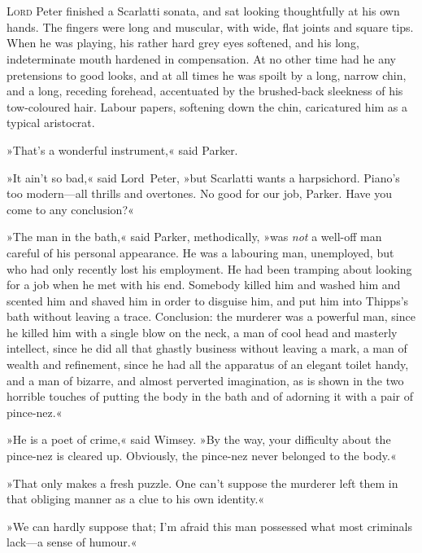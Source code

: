 \chapter[Chapter \thechapter]{}
\lettrine[lines=4]{L}{ord} Peter finished a Scarlatti sonata, and sat looking thoughtfully at his own hands. The fingers were long and muscular, with wide, flat joints and square tips. When he was playing, his rather hard grey eyes softened, and his long, indeterminate mouth hardened in compensation. At no other time had he any pretensions to good looks, and at all times he was spoilt by a long, narrow chin, and a long, receding forehead, accentuated by the brushed-back sleekness of his tow-coloured hair. Labour papers, softening down the chin, caricatured him as a typical aristocrat.

»That's a wonderful instrument,« said Parker.

»It ain't so bad,« said Lord~Peter, »but Scarlatti wants a harpsichord. Piano's too modern—all thrills and overtones. No good for our job, Parker. Have you come to any conclusion?«

»The man in the bath,« said Parker, methodically, »was \textit{not} a well-off man careful of his personal appearance. He was a labouring man, unemployed, but who had only recently lost his employment. He had been tramping about looking for a job when he met with his end. Somebody killed him and washed him and scented him and shaved him in order to disguise him, and put him into Thipps's bath without leaving a trace. Conclusion: the murderer was a powerful man, since he killed him with a single blow on the neck, a man of cool head and masterly intellect, since he did all that ghastly business without leaving a mark, a man of wealth and refinement, since he had all the apparatus of an elegant toilet handy, and a man of bizarre, and almost perverted imagination, as is shown in the two horrible touches of putting the body in the bath and of adorning it with a pair of pince-nez.«

»He is a poet of crime,« said Wimsey. »By the way, your difficulty about the pince-nez is cleared up. Obviously, the pince-nez never belonged to the body.«

»That only makes a fresh puzzle. One can't suppose the murderer left them in that obliging manner as a clue to his own identity.«

»We can hardly suppose that; I'm afraid this man possessed what most criminals lack—a sense of humour.«

